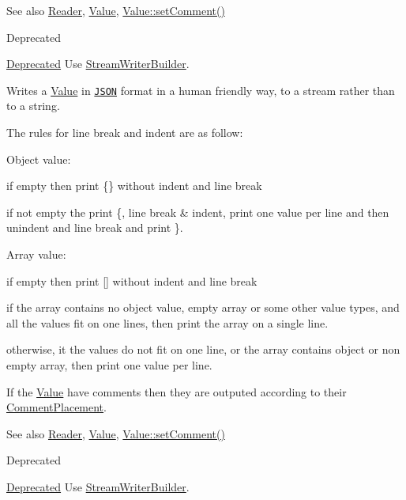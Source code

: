 \begin{DoxySeeAlso}{See also}
\hyperlink{classJson_1_1Reader}{Reader}, \hyperlink{classJson_1_1Value}{Value}, \hyperlink{classJson_1_1Value_a29f3a30f7e5d3af6f38d57999bf5b480}{Value\+::set\+Comment()} 
\end{DoxySeeAlso}
\begin{DoxyRefDesc}{Deprecated}
\item[\hyperlink{deprecated__deprecated000009}{Deprecated}]Use \hyperlink{classJson_1_1StreamWriterBuilder}{Stream\+Writer\+Builder}. \end{DoxyRefDesc}
Writes a \hyperlink{classJson_1_1Value}{Value} in \href{http://www.json.org}{\tt J\+S\+ON} format in a human friendly way, to a stream rather than to a string.

The rules for line break and indent are as follow\+:
\begin{DoxyItemize}
\item Object value\+:
\begin{DoxyItemize}
\item if empty then print \{\} without indent and line break
\item if not empty the print \textquotesingle{}\{\textquotesingle{}, line break \& indent, print one value per line and then unindent and line break and print \textquotesingle{}\}\textquotesingle{}.
\end{DoxyItemize}
\item Array value\+:
\begin{DoxyItemize}
\item if empty then print \mbox{[}\mbox{]} without indent and line break
\item if the array contains no object value, empty array or some other value types, and all the values fit on one lines, then print the array on a single line.
\item otherwise, it the values do not fit on one line, or the array contains object or non empty array, then print one value per line.
\end{DoxyItemize}
\end{DoxyItemize}

If the \hyperlink{classJson_1_1Value}{Value} have comments then they are outputed according to their \hyperlink{namespaceJson_a4fc417c23905b2ae9e2c47d197a45351}{Comment\+Placement}.

\begin{DoxySeeAlso}{See also}
\hyperlink{classJson_1_1Reader}{Reader}, \hyperlink{classJson_1_1Value}{Value}, \hyperlink{classJson_1_1Value_a29f3a30f7e5d3af6f38d57999bf5b480}{Value\+::set\+Comment()} 
\end{DoxySeeAlso}
\begin{DoxyRefDesc}{Deprecated}
\item[\hyperlink{deprecated__deprecated000010}{Deprecated}]Use \hyperlink{classJson_1_1StreamWriterBuilder}{Stream\+Writer\+Builder}. \end{DoxyRefDesc}

